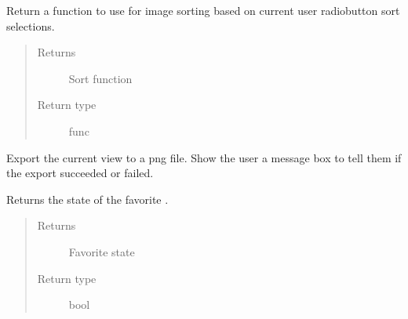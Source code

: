 \documentclass[letterpaper,10pt,english]{sphinxmanual}
\begin{document}
\begin{fulllineitems}
\begin{fulllineitems}
\label{\detokenize{polo.widgets:polo.widgets.slideshow_inspector.slideshowInspector.current_sort_function}}
Return a function to use for image sorting based on current user
radiobutton sort selections.
\begin{quote}\begin{description}
\item[{Returns}] \leavevmode
Sort function

\item[{Return type}] \leavevmode
func

\end{description}\end{quote}

\end{fulllineitems}


\begin{fulllineitems}
\label{\detokenize{polo.widgets:polo.widgets.slideshow_inspector.slideshowInspector.export_current_view}}
Export the current view to a png file. Show the user a message box
to tell them if the export succeeded or failed.

\end{fulllineitems}


\begin{fulllineitems}
\label{\detokenize{polo.widgets:polo.widgets.slideshow_inspector.slideshowInspector.favorites}}
Returns the state of the favorite .
\begin{quote}\begin{description}
\item[{Returns}] \leavevmode
Favorite  state

\item[{Return type}] \leavevmode
bool


\end{description}
\end{quote}
\end{fulllineitems}
\end{fulllineitems}
\end{document}
